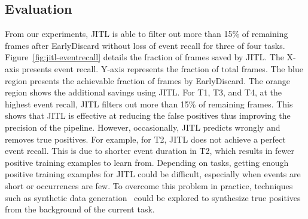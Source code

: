 \subsection{Evaluation}

From our experiments, JITL is able to filter out more than 15\% of remaining
frames after EarlyDiscard without loss of event recall for three of four tasks.
Figure~\ref{fig:jitl-eventrecall} details the fraction of frames saved by JITL.
The X-axis presents event recall. Y-axis represents the fraction of total
frames. The blue region presents the achievable fraction of frames by
EarlyDiscard. The orange region shows the additional savings using JITL. For T1,
T3, and T4, at the highest event recall, JITL filters out more than 15\% of
remaining frames. This shows that JITL is effective at reducing the false
positives thus improving the precision of the pipeline. However,
occasionally, JITL predicts wrongly and removes true positives. For example, for
T2, JITL does not achieve a perfect event recall. This is due to shorter event
duration in T2, which results in fewer positive training examples to learn
from. Depending on tasks, getting enough positive training examples for JITL
could be difficult, especially when events are short or occurrences are few. To
overcome this problem in practice, techniques such as synthetic data
generation~\cite{Dwibedi2017} could be explored to synthesize true positives
from the background of the current task.

